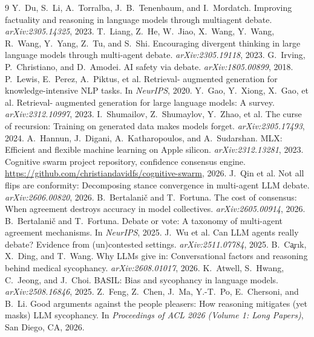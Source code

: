 \documentclass[10pt,twocolumn]{article}
\begin{document}

\begin{thebibliography}{9}
   Y.~Du, S.~Li, A.~Torralba, J.~B.~Tenenbaum, and
    I.~Mordatch. Improving factuality and reasoning in language models through
    multiagent debate. \emph{arXiv:2305.14325}, 2023.
   T.~Liang, Z.~He, W.~Jiao, X.~Wang, Y.~Wang,
    R.~Wang, Y.~Yang, Z.~Tu, and S.~Shi. Encouraging divergent thinking in
    large language models through multi-agent debate. \emph{arXiv:2305.19118},
    2023.
   G.~Irving, P.~Christiano, and D.~Amodei. AI safety via
    debate. \emph{arXiv:1805.00899}, 2018.
   P.~Lewis, E.~Perez, A.~Piktus, et al. Retrieval-
    augmented generation for knowledge-intensive NLP tasks. In \emph{NeurIPS},
    2020.
   Y.~Gao, Y.~Xiong, X.~Gao, et al. Retrieval-
    augmented generation for large language models: A survey.
    \emph{arXiv:2312.10997}, 2023.
   I.~Shumailov, Z.~Shumaylov, Y.~Zhao, et al. The
    curse of recursion: Training on generated data makes models forget.
    \emph{arXiv:2305.17493}, 2024.
   A.~Hannun, J.~Digani, A.~Katharopoulos, and A.~Sudarshan. MLX:
    Efficient and flexible machine learning on Apple silicon.
    \emph{arXiv:2312.13281}, 2023.
   Cognitive swarm project repository, confidence consensus
    engine. \url{https://github.com/christiandavidfs/cognitive-swarm}, 2026.
   J.~Qin et al. Not all flips are conformity:
    Decomposing stance convergence in multi-agent LLM debate.
    \emph{arXiv:2606.00820}, 2026.
   B.~Bertalani\v{c} and T.~Fortuna. The cost of
    consensus: When agreement destroys accuracy in model collectives.
    \emph{arXiv:2605.00914}, 2026.
   B.~Bertalani\v{c} and T.~Fortuna. Debate or vote: A
    taxonomy of multi-agent agreement mechanisms. In \emph{NeurIPS}, 2025.
   J.~Wu et al. Can LLM agents really debate?
    Evidence from (un)contested settings. \emph{arXiv:2511.07784}, 2025.
   B.~C\c{a}r{\i}k, X.~Ding, and T.~Wang. Why LLMs give in:
    Conversational factors and reasoning behind medical sycophancy.
    \emph{arXiv:2608.01017}, 2026.
   K.~Atwell, S.~Hwang, C.~Jeong, and J.~Choi. BASIL: Bias
    and sycophancy in language models. \emph{arXiv:2508.16846}, 2025.
   Z.~Feng, Z.~Chen, J.~Ma, Y.-T.~Po, E.~Chersoni, and
    B.~Li. Good arguments against the people pleasers: How reasoning mitigates
    (yet masks) LLM sycophancy. In \emph{Proceedings of ACL 2026 (Volume 1:
    Long Papers)}, San Diego, CA, 2026.
\end{thebibliography}
\end{document}
